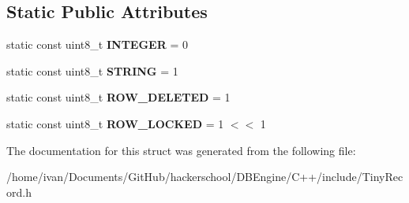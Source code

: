 \subsection*{Static Public Attributes}
\begin{DoxyCompactItemize}
\item 
\hypertarget{structTiny_1_1TinyValue_abeb48d8ece34c3723edd83b56fb96cd6}{static const uint8\-\_\-t {\bfseries I\-N\-T\-E\-G\-E\-R} = 0}\label{structTiny_1_1TinyValue_abeb48d8ece34c3723edd83b56fb96cd6}

\item 
\hypertarget{structTiny_1_1TinyValue_af957e75464005c9c4824c345bfc52784}{static const uint8\-\_\-t {\bfseries S\-T\-R\-I\-N\-G} = 1}\label{structTiny_1_1TinyValue_af957e75464005c9c4824c345bfc52784}

\item 
\hypertarget{structTiny_1_1TinyValue_ab9c4214f3b3597d95e163a9749cc570f}{static const uint8\-\_\-t {\bfseries R\-O\-W\-\_\-\-D\-E\-L\-E\-T\-E\-D} = 1}\label{structTiny_1_1TinyValue_ab9c4214f3b3597d95e163a9749cc570f}

\item 
\hypertarget{structTiny_1_1TinyValue_aa1bcdf0f950a984051d048c72df96244}{static const uint8\-\_\-t {\bfseries R\-O\-W\-\_\-\-L\-O\-C\-K\-E\-D} = 1 $<$$<$ 1}\label{structTiny_1_1TinyValue_aa1bcdf0f950a984051d048c72df96244}

\end{DoxyCompactItemize}


The documentation for this struct was generated from the following file\-:\begin{DoxyCompactItemize}
\item 
/home/ivan/\-Documents/\-Git\-Hub/hackerschool/\-D\-B\-Engine/\-C++/include/Tiny\-Record.\-h\end{DoxyCompactItemize}

